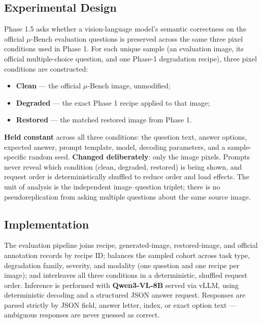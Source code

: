 \documentclass[11pt]{article}
\begin{document}
\subsection{Experimental Design}

Phase 1.5 asks whether a vision-language model's semantic correctness on the official
$\mu$-Bench evaluation questions is preserved across the same three pixel conditions
used in Phase 1. For each unique sample (an evaluation image, its official multiple-choice
question, and one Phase-1 degradation recipe), three pixel conditions are constructed:

\begin{itemize}[leftmargin=1.4em]
    \item \textbf{Clean} --- the official $\mu$-Bench image, unmodified;
    \item \textbf{Degraded} --- the exact Phase 1 recipe applied to that image;
    \item \textbf{Restored} --- the matched restored image from Phase 1.
\end{itemize}

\textbf{Held constant} across all three conditions: the question text, answer options,
expected answer, prompt template, model, decoding parameters, and a sample-specific
random seed. \textbf{Changed deliberately}: only the image pixels. Prompts never reveal
which condition (clean, degraded, restored) is being shown, and request order is
deterministically shuffled to reduce order and load effects. The unit of analysis is the
independent image--question triplet; there is no pseudoreplication from asking multiple
questions about the same source image.

\subsection{Implementation}

The evaluation pipeline joins recipe, generated-image, restored-image, and official
annotation records by recipe ID; balances the sampled cohort across task type,
degradation family, severity, and modality (one question and one recipe per image); and
interleaves all three conditions in a deterministic, shuffled request order. Inference
is performed with \textbf{Qwen3-VL-8B} served via vLLM, using deterministic decoding and
a structured JSON answer request. Responses are parsed strictly by JSON field,
answer letter, index, or exact option text --- ambiguous responses are never guessed as
correct.
\end{document}

